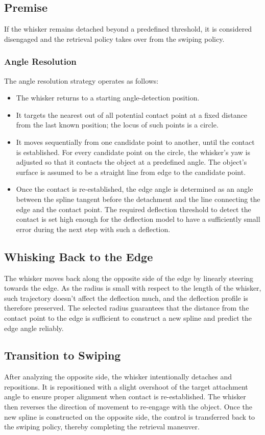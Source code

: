 \subsection{Premise}
If the whisker remains detached beyond a predefined threshold, it is considered disengaged and the retrieval policy takes over from the swiping policy.

\subsubsection{Angle Resolution}
The angle resolution strategy operates as follows:
\begin{itemize}
    \item The whisker returns to a starting angle-detection position.
    \item It targets the nearest out of all potential contact point at a fixed distance from the last known position; the locus of such points is a circle.
    \item It moves sequentially from one candidate point to another, until the contact is established.
    For every candidate point on the circle, the whisker's yaw is adjusted so that it contacts the object at a predefined angle.
    The object's surface is assumed to be a straight line from edge to the candidate point.
    \item Once the contact is re-established, the edge angle is determined as an angle between the spline tangent before the detachment and the line connecting the edge and the contact point.
    The required deflection threshold to detect the contact is set high enough for the deflection model to have a sufficiently small error during the next step with such a deflection.
\end{itemize}

\subsection{Whisking Back to the Edge}
The whisker moves back along the opposite side of the edge by linearly steering towards the edge.
As the radius is small with respect to the length of the whisker, such trajectory doesn't affect the deflection much, and the deflection profile is therefore preserved.
The selected radius guarantees that the distance from the contact point to the edge is sufficient to construct a new spline and predict the edge angle reliably.

\subsection{Transition to Swiping}
After analyzing the opposite side, the whisker intentionally detaches and repositions.
It is repositioned with a slight overshoot of the target attachment angle to ensure proper alignment when contact is re-established.
The whisker then reverses the direction of movement to re-engage with the object.
Once the new spline is constructed on the opposite side, the control is transferred back to the swiping policy, thereby completing the retrieval maneuver.


